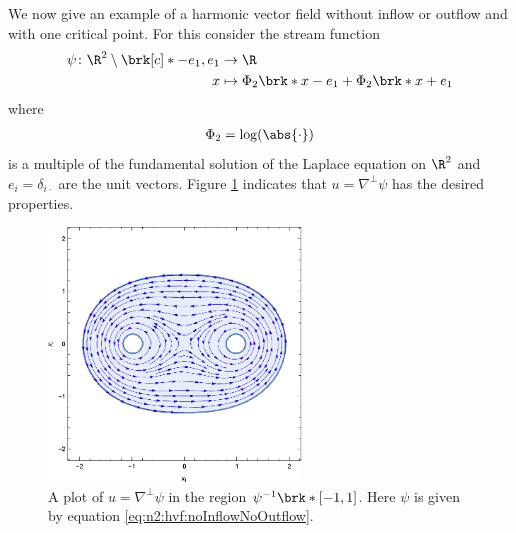 We now give an example of a harmonic vector field without 
inflow or outflow and with one critical point.
For this consider the stream function
\begin{equation}
  \begin{aligned}
  \psi\colon\R^2\setminus\brk[c]*{-e_1,e_1}&\to\R \\
  x&\mapsto\Phi_2\brk*{x-e_1}+\Phi_2\brk*{x+e_1}
  \end{aligned}\label{eq:n2:hvf:noInflowNoOutflow}
\end{equation}
where
\begin{align*}
  \Phi_2=\log(\abs{\cdot})
\end{align*}
is a multiple of the fundamental solution of the Laplace equation on $\R^2$ and $e_i=\delta_{i\cdot}$ are the unit vectors.
Figure \ref{pl:n2_hvf_noInflowNoOutflow} indicates that $u=\nabla^\perp\psi$ has the desired properties.
\begin{figure}
  \centering
  \includegraphics[width=0.6\textwidth]{../Plots/HarmonicVectorFields_gr1.eps}
  \caption{A plot of $u=\nabla^\perp\psi$ in the region $\psi^{-1}\brk*{[-1,1]}$.
    Here $\psi$ is given by equation \eqref{eq:n2:hvf:noInflowNoOutflow}.}
  \label{pl:n2_hvf_noInflowNoOutflow}
\end{figure}

